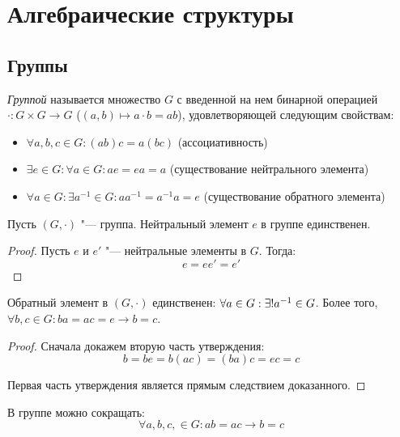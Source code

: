 \section{Алгебраические структуры}

\subsection{Группы}

\begin{definition}
	\textit{Группой} называется множество $G$ с введенной на нем бинарной операцией $\cdot: G \times G \rightarrow G$ ($(a, b) \mapsto a\cdot b = ab$), удовлетворяющей следующим свойствам:
	\begin{itemize}
		\item $\forall a, b, c \in G : (ab)c = a(bc)$ (ассоциативность)
		\item $\exists e \in G: \forall a \in G: ae = ea = a$ (существование нейтрального элемента)
		\item $\forall a \in G: \exists a^{-1} \in G: aa^{-1} = a^{-1}a = e$ (существование обратного элемента)
	\end{itemize}
\end{definition}

\begin{proposition}
	Пусть $(G, \cdot)$ "--- группа. Нейтральный элемент $e$ в группе единственен.
\end{proposition}

\begin{proof}
	Пусть $e$ и $e'$ "--- нейтральные элементы в $G$. Тогда:
	\[e = ee' = e'\]
\end{proof}

\begin{proposition}
	Обратный элемент в $(G, \cdot)$ единственен: $\forall a \hm{\in} G: \exists! a^{-1} \in G$. Более того, $\forall b, c \in G: ba = ac = e \rightarrow b = c$.
\end{proposition}

\begin{proof}
	Сначала докажем вторую часть утверждения:
	\[b = be = b(ac) = (ba)c = ec = c\]
	
	Первая часть утверждения является прямым следствием доказанного.
\end{proof}

\begin{proposition}
	В группе можно сокращать: 
	\[\forall a, b, c, \in G: ab = ac \rightarrow b = c\]
\end{proposition}


